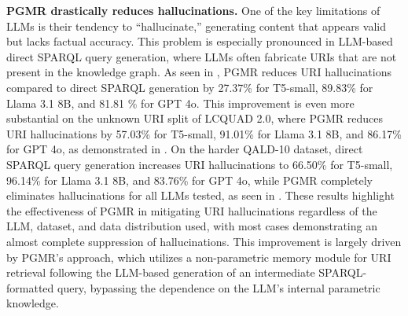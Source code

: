 \noindent \textbf{PGMR drastically reduces hallucinations.}
One of the key limitations of LLMs is their tendency to “hallucinate,” generating content that appears valid but lacks factual accuracy. This problem is especially pronounced in LLM-based direct SPARQL query generation, where LLMs often fabricate URIs that are not present in the knowledge graph.
As seen in , PGMR reduces URI hallucinations compared to direct SPARQL generation by 27.37\% for T5-small, 89.83\% for Llama 3.1 8B, and 81.81 \% for GPT 4o.
This improvement is even more substantial on the unknown URI split of LCQUAD 2.0, where PGMR reduces URI hallucinations by 57.03\% for T5-small, 91.01\% for Llama 3.1 8B, and 86.17\% for GPT 4o, as demonstrated in .
On the harder QALD-10 dataset, direct SPARQL query generation increases URI hallucinations to 66.50\% for T5-small, 96.14\% for Llama 3.1 8B, and 83.76\% for GPT 4o, while PGMR completely eliminates hallucinations for all LLMs tested, as seen in .
These results highlight the effectiveness of PGMR in mitigating URI hallucinations regardless of the LLM, dataset, and data distribution used, with most cases demonstrating an almost complete suppression of hallucinations.
This improvement is largely driven by PGMR’s approach, which utilizes a non-parametric memory module for URI retrieval following the LLM-based generation of an intermediate SPARQL-formatted query, bypassing the dependence on the LLM’s internal parametric knowledge.

